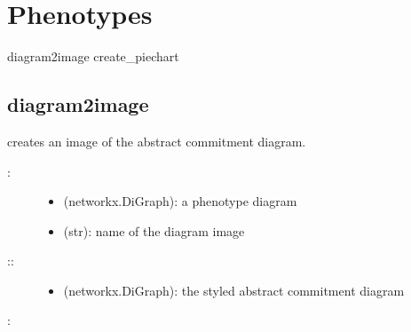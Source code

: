 \documentclass[letterpaper,10pt,english]{sphinxmanual}
\begin{document}
\section{Phenotypes}
\label{\detokenize{Phenotypes::doc}}\label{\detokenize{Phenotypes:phenotypes}}\label{\detokenize{Phenotypes:id1}}
diagram2image
create\_piechart


\subsection{diagram2image}
\label{\detokenize{Phenotypes:diagram2image}}\label{\detokenize{Phenotypes:phenotypes-diagram2image}}

\begin{fulllineitems}
\label{\detokenize{Phenotypes:PyBoolNet.Phenotypes.diagram2image}}
creates an image of the abstract commitment diagram.
\begin{description}
\item[{:}] \leavevmode\begin{itemize}
\item {} 
 (networkx.DiGraph): a phenotype diagram

\item {} 
 (str): name of the diagram image

\end{itemize}

\item[{::}] \leavevmode\begin{itemize}
\item {} 
 (networkx.DiGraph): the styled abstract commitment diagram

\end{itemize}

\end{description}

:

\begin{sphinxVerbatim}[commandchars=\\\{\}]
  
\end{sphinxVerbatim}

\end{fulllineitems}
\end{document}
